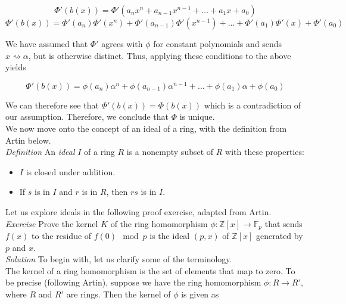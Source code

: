\begin{displaymath}
\Phi'(b(x))=\Phi'(a_{n}x^{n}+a_{n-1}x^{n-1}+ \ldots + a_{1}x + a_{0})
\end{displaymath}
\begin{displaymath}
\Phi'(b(x))=\Phi'(a_{n})\Phi'(x^{n})+\Phi'(a_{n-1})\Phi'(x^{n-1})+ \ldots + \Phi'(a_{1})\Phi'(x) + \Phi'(a_{0})
\end{displaymath}

We have assumed that $\Phi'$ agrees with $\phi$ for constant polynomials and sends $x \rightsquigarrow \alpha$, but is otherwise distinct.  Thus, applying these conditions to the above yields

\begin{displaymath}
\Phi'(b(x))=\phi(a_{n})\alpha^{n}+\phi(a_{n-1})\alpha^{n-1}+ \ldots + \phi(a_{1})\alpha + \phi(a_{0})
\end{displaymath}

We can therefore see that $\Phi'(b(x))=\Phi(b(x))$ which is a contradiction of our assumption.  Therefore, we conclude that $\Phi$ is unique.\\

We now move onto the concept of an ideal of a ring, with the definition from Artin below.\\

\textit{Definition} An \textit{ideal}  $I$ of a ring $R$ is a nonempty subset of $R$ with these properties:

\begin{itemize}
\item $I$ is closed under addition.
\item If $s$ is in $I$ and $r$ is in $R$, then $rs$ is in $I$.
\end{itemize}

Let us explore ideals in the following proof exercise, adapted from Artin.\\

\textit{Exercise} Prove the kernel $K$ of the ring homomorphism $\phi: \mathbb{Z}[x] \longrightarrow \mathbb{F}_{p}$ that sends $f(x)$ to the residue of $f(0) \mod p$ is the ideal $(p,x)$ of $\mathbb{Z}[x]$ generated by $p$ and $x$.\\

\textit{Solution}  To begin with, let us clarify some of the terminology.\\

The kernel of a ring homomorphism is the set of elements that map to zero.  To be precise (following Artin), suppose we have the ring homomorphism $\phi: R \longrightarrow R'$, where $R$ and $R'$ are rings.  Then the kernel of $\phi$ is given as

